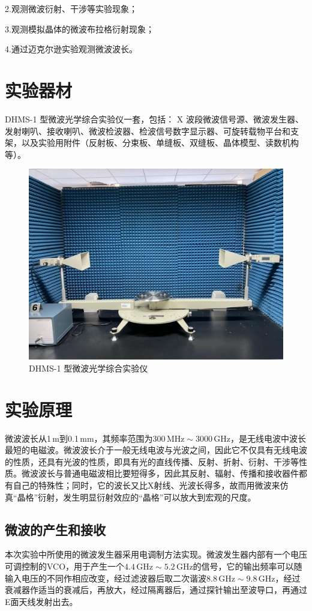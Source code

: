 \documentclass[UTF8]{article}
\theoremstyle{MyLineTheoremStyle} %
\theoremstyle{MyBlockTheoremStyle} %
\theoremstyle{MySubsubsectionStyle} %
\begin{document}
2.观测微波衍射、干涉等实验现象；

3.观测模拟晶体的微波布拉格衍射现象；

4.通过迈克尔逊实验观测微波波长。

\section{实验器材}
DHMS-1 型微波光学综合实验仪一套，包括： X 波段微波信号源、微波发生器、发射喇叭、接收喇叭、微波检波器、检波信号数字显示器、可旋转载物平台和支架，以及实验用附件（反射板、分束板、单缝板、双缝板、晶体模型、读数机构等）。
\begin{figure}[H]\centering
    \includegraphics[width=0.6\columnwidth]{assets/0/IMG_1862.jpg}
    \caption{DHMS-1 型微波光学综合实验仪}
\end{figure}

\section{实验原理}
微波波长从1\,m到0.1\,mm，其频率范围为$ 300\,\mathrm{MHz}\sim3000\,\mathrm{GHz} $，是无线电波中波长最短的电磁波。微波波长介于一般无线电波与光波之间，因此它不仅具有无线电波的性质，还具有光波的性质，即具有光的直线传播、反射、折射、衍射、干涉等性质。微波波长与普通电磁波相比要短得多，因此其反射、辐射、传播和接收器件都有自己的特殊性；同时，它的波长又比X射线、光波长得多，故而用微波来仿真“晶格”衍射，发生明显衍射效应的“晶格”可以放大到宏观的尺度。

\subsection{微波的产生和接收}
本次实验中所使用的微波发生器采用电调制方法实现。微波发生器内部有一个电压可调控制的VCO，用于产生一个$ 4.4\,\mathrm{GHz}\sim 5.2\,\mathrm{GHz} $的信号，它的输出频率可以随输入电压的不同作相应改变，经过滤波器后取二次谐波$ 8.8\,\mathrm{GHz}\sim9.8\,\mathrm{GHz} $，经过衰减器作适当的衰减后，再放大，经过隔离器后，通过探针输出至波导口，再通过E面天线发射出去。
\end{document}
